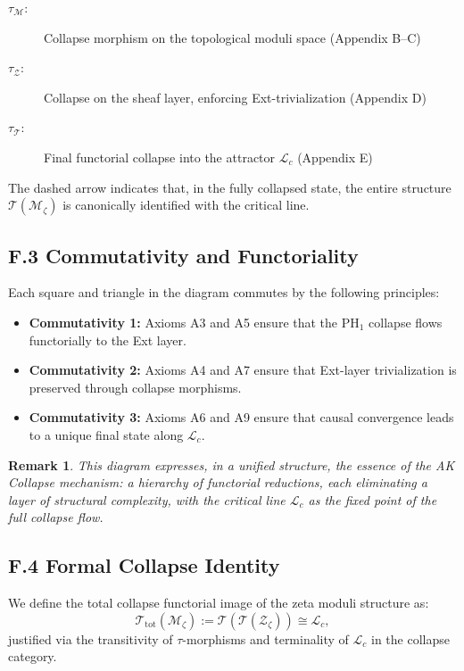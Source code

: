 \documentclass[11pt]{article}
\newtheorem{remark}[theorem]{Remark}
\begin{document}
\begin{description}
    \item[$\tau_{\mathcal{M}}$:] Collapse morphism on the topological moduli space (Appendix B–C)
    \item[$\tau_{\mathcal{Z}}$:] Collapse on the sheaf layer, enforcing Ext-trivialization (Appendix D)
    \item[$\tau_{\mathcal{T}}$:] Final functorial collapse into the attractor $\mathcal{L}_c$ (Appendix E)
\end{description}

The dashed arrow indicates that, in the fully collapsed state, the entire structure $\mathcal{T}(\mathcal{M}_\zeta)$ is canonically identified with the critical line.

\subsection*{F.3 Commutativity and Functoriality}

Each square and triangle in the diagram commutes by the following principles:

\begin{itemize}
    \item \textbf{Commutativity 1:} Axioms A3 and A5 ensure that the $\mathrm{PH}_1$ collapse flows functorially to the Ext layer.
    \item \textbf{Commutativity 2:} Axioms A4 and A7 ensure that Ext-layer trivialization is preserved through collapse morphisms.
    \item \textbf{Commutativity 3:} Axioms A6 and A9 ensure that causal convergence leads to a unique final state along $\mathcal{L}_c$.
\end{itemize}

\begin{remark}
This diagram expresses, in a unified structure, the essence of the AK Collapse mechanism:  
a hierarchy of functorial reductions, each eliminating a layer of structural complexity,  
with the critical line $\mathcal{L}_c$ as the fixed point of the full collapse flow.
\end{remark}

\subsection*{F.4 Formal Collapse Identity}

We define the total collapse functorial image of the zeta moduli structure as:
\[
\mathcal{T}_{\text{tot}}(\mathcal{M}_\zeta) := \mathcal{T}(\mathcal{T}(\mathcal{Z}_\zeta)) \cong \mathcal{L}_c,
\]
justified via the transitivity of $\tau$-morphisms and terminality of $\mathcal{L}_c$ in the collapse category.
\end{document}
